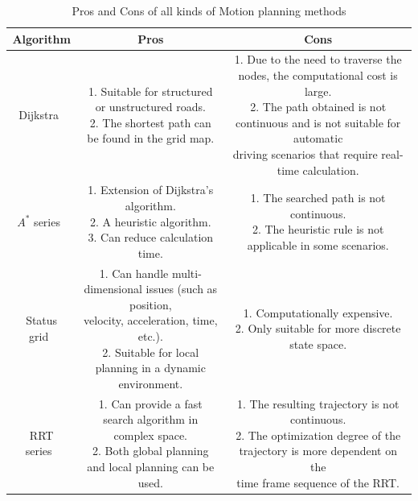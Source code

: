 \documentclass[conference]{IEEEtran}
\begin{document}
\begin{table}[htbp]
	\centering
	\caption{\label{tab:motion_planning}Pros and Cons of all kinds of Motion planning methods
	}
	\setlength{\tabcolsep}{4pt}
	\begin{tabular}{|c|c|c|}%
		\hline
		\multicolumn{1}{|c|}{\textbf{Algorithm}} & \multicolumn{1}{|c|}{\textbf{Pros}} & \multicolumn{1}{|c|}{\textbf{Cons}} \\
		\hline
		Dijkstra~\cite{dijkstra1959note} & \makecell[l]{1. Suitable for structured or unstructured roads. \\ 2. The shortest path can be found in the grid map.\\}  & \makecell[l]{1. Due to the need to traverse the nodes, the computational cost is large.\\ 2. The path obtained is not continuous and is not suitable for automatic\\ driving scenarios that require real-time calculation.}\\
		\hline
		$A^*$ series~\cite{Hart1968formal} & \makecell[l]{1. Extension of Dijkstra's algorithm. \\ 2. A heuristic algorithm.\\ 3. Can reduce calculation time. \\}  & \makecell[l]{1. The searched path is not continuous.\\ 2. The heuristic rule is not applicable in some scenarios.}\\
		\hline
		Status grid~\cite{Pivtoraiko2005} & \makecell[l]{1. Can handle multi-dimensional issues (such as position,\\ velocity, acceleration, time, etc.). \\ 2. Suitable for local planning in a dynamic environment.\\}  & \makecell[l]{1. Computationally expensive.\\ 2. Only suitable for more discrete state space.}\\
		\hline
		RRT series~\cite{karaman2011sampling} & \makecell[l]{1. Can provide a fast search algorithm in complex space.\\ 2. Both global planning and local planning can be used.\\}  & \makecell[l]{1. The resulting trajectory is not continuous.\\ 2. The optimization degree of the trajectory is more dependent on the\\ time frame sequence of the RRT.}\\

\end{tabular}
\end{table}
\end{document}
